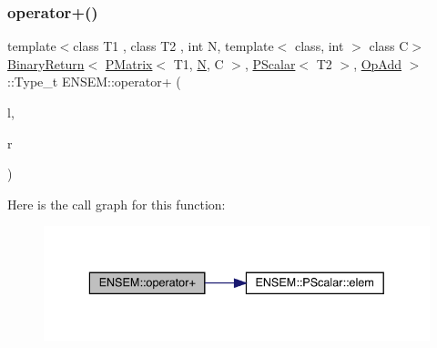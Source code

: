 \subsubsection{\texorpdfstring{operator+()}{operator+()}\hspace{0.1cm}{\footnotesize\ttfamily [3/4]}}
{\footnotesize\ttfamily template$<$class T1 , class T2 , int N, template$<$ class, int $>$ class C$>$ \\
\mbox{\hyperlink{structENSEM_1_1BinaryReturn}{Binary\+Return}}$<$ \mbox{\hyperlink{classENSEM_1_1PMatrix}{P\+Matrix}}$<$ T1, \mbox{\hyperlink{operator__name__util_8cc_a7722c8ecbb62d99aee7ce68b1752f337}{N}}, C $>$, \mbox{\hyperlink{classENSEM_1_1PScalar}{P\+Scalar}}$<$ T2 $>$, \mbox{\hyperlink{structENSEM_1_1OpAdd}{Op\+Add}} $>$\+::Type\+\_\+t E\+N\+S\+E\+M\+::operator+ (\begin{DoxyParamCaption}\item[{const \mbox{\hyperlink{classENSEM_1_1PMatrix}{P\+Matrix}}$<$ T1, \mbox{\hyperlink{operator__name__util_8cc_a7722c8ecbb62d99aee7ce68b1752f337}{N}}, C $>$ \&}]{l,  }\item[{const \mbox{\hyperlink{classENSEM_1_1PScalar}{P\+Scalar}}$<$ T2 $>$ \&}]{r }\end{DoxyParamCaption})\hspace{0.3cm}{\ttfamily [inline]}}

Here is the call graph for this function\+:\nopagebreak
\begin{figure}[H]
\begin{center}
\leavevmode
\includegraphics[width=336pt]{df/d0a/group__primmatrix_gacd1e2ab4740e640c1aa2862faf4436db_cgraph}
\end{center}
\end{figure}
\mbox{\label{group__primmatrix_ga39561cdaedaf3bb4fb108575dae42de6}} 
